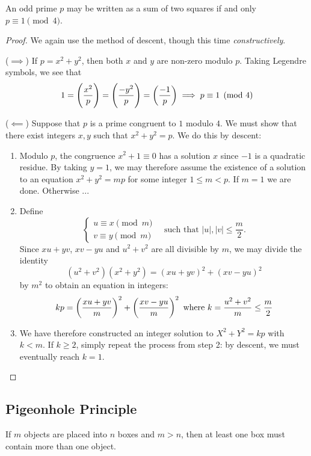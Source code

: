\begin{exercise}{}{}
An odd prime $p$ may be written as a sum of two squares if and only $p \equiv 1 \pmod 4$.
\end{exercise}

\begin{proof}
We again use the method of descent, though this time \textit{constructively}.

($\implies$) If $p=x^2+y^2$, then both $x$ and $y$ are non-zero modulo $p$. Taking Legendre symbols, we see that
\[ 1=\left(\frac{x^2}{p}\right)=\left(\frac{-y^2}{p}\right)=\left(\frac{-1}{p}\right) \implies p\equiv1\pmod4 \]

($\impliedby$) Suppose that $p$ is a prime congruent to $1$ modulo $4$. We must show that there exist integers $x,y$ such that $x^2+y^2=p$. We do this by descent:
\begin{enumerate}
\item Modulo $p$, the congruence $x^2+1\equiv0$ has a solution $x$ since $-1$ is a quadratic residue. By taking $y=1$, we may therefore assume the existence of a solution to an equation $x^2+y^2=mp$ for some integer $1 \le m<p$. If $m=1$ we are done. Otherwise ...

\item Define
\[ \begin{cases}
u\equiv x\pmod m \\
v\equiv y\pmod m
\end{cases} \quad \text{such that } |u|,|v|\le\frac{m}{2}. \]
Since $xu+yv$, $xv-yu$ and $u^2+v^2$ are all divisible by $m$, we may divide the identity
\[ (u^2+v^2)(x^2+y^2)=(xu+yv)^2+(xv-yu)^2 \]
by $m^2$ to obtain an equation in integers:
\[ kp=\left(\frac{xu+yv}{m}\right)^2+\left(\frac{xv-yu}{m}\right)^2 \text{ where } k=\frac{u^2+v^2}{m}\le\frac{m}{2} \]

\item We have therefore constructed an integer solution to $X^2+Y^2=kp$ with $k<m$. If $k \ge 2$, simply repeat the process from step 2: by descent, we must eventually reach $k=1$.
\end{enumerate}
\end{proof}

\subsection{Pigeonhole Principle}
\begin{theorem}
If $m$ objects are placed into $n$ boxes and $m>n$, then at least one box must contain more than one object.
\end{theorem}

